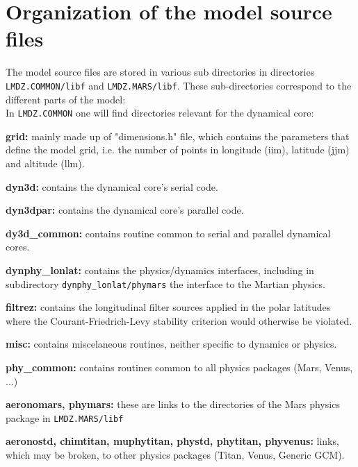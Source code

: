 \section{Organization of the model source files}

The model source files are stored in various sub directories
in directories {\tt LMDZ.COMMON/libf} and {\tt LMDZ.MARS/libf}.
These sub-directories correspond to the different parts of the model: \\
In {\tt LMDZ.COMMON} one will find directories relevant for the dynamical core:
\begin{description}
\item{\bf grid:} mainly made up of "dimensions.h" file,
which contains the parameters that define the model grid,
i.e. the number of points in longitude (iim), latitude (jjm) and altitude
(llm).

\item{\bf dyn3d:} contains the dynamical core's serial code.

\item{\bf dyn3dpar:} contains the dynamical core's parallel code.

\item{\bf dy3d\_common:} contains routine common to serial and parallel dynamical cores.

\item{\bf dynphy\_lonlat:} contains the physics/dynamics interfaces, including in subdirectory
{\tt dynphy\_lonlat/phymars} the interface to the Martian physics.

\item{\bf filtrez:} contains the longitudinal filter sources applied in the
polar latitudes where the Courant-Friedrich-Levy stability criterion would otherwise be violated.

\item{\bf misc:} contains miscelaneous routines, neither specific to dynamics or physics.

\item{\bf phy\_common:} contains routines common to all physics packages (Mars, Venus, ...)

\item{\bf aeronomars, phymars:} these are links to the directories of the Mars physics package in
{\tt LMDZ.MARS/libf}

\item{\bf aeronostd, chimtitan, muphytitan, phystd, phytitan, phyvenus:} links, which may be broken, to
other physics packages (Titan, Venus, Generic GCM).
\end{description}

